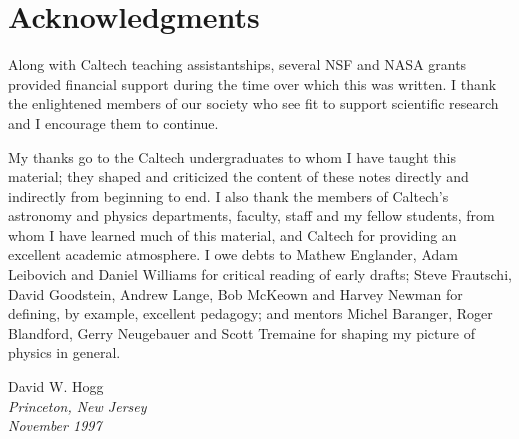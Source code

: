 \newpage
\section*{Acknowledgments}

Along with Caltech teaching assistantships, several NSF and NASA
grants provided financial support during the time over which this was
written.  I thank the enlightened members of our society who see fit
to support scientific research and I encourage them to continue.

My thanks go to the Caltech undergraduates to whom I have taught this
material; they shaped and criticized the content of these notes
directly and indirectly from beginning to end.  I also thank the
members of Caltech's astronomy and physics departments, faculty, staff
and my fellow students, from whom I have learned much of this
material, and Caltech for providing an excellent academic atmosphere.
I owe debts to Mathew Englander, Adam Leibovich and Daniel Williams
for critical reading of early drafts; Steve Frautschi, David
Goodstein, Andrew Lange, Bob McKeown and Harvey Newman for defining,
by example, excellent pedagogy; and mentors Michel Baranger, Roger
Blandford, Gerry Neugebauer and Scott Tremaine for shaping my picture
of physics in general.

\vspace{1ex}
\noindent
David W. Hogg \\
{\em Princeton, New Jersey\/} \\
{\em November 1997\/}
